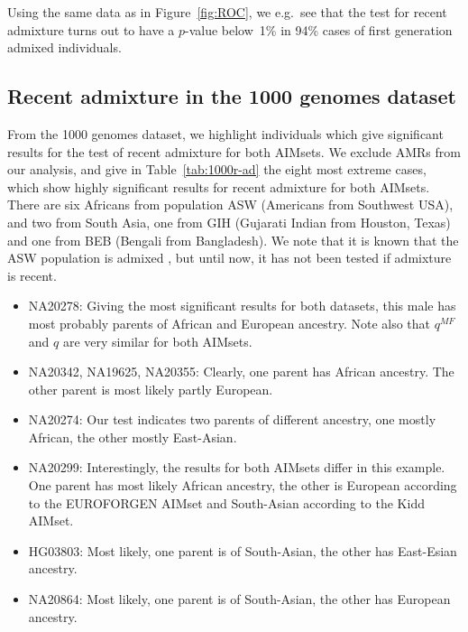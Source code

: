 \documentclass[12pt]{article}
\theoremstyle{definition}
\begin{document}
\begin{table}
  \centering
  
  \caption{Using the same data as in Figure~\ref{fig:ROC}, we e.g.\
    see that the test for recent admixture turns out to have a
    $p$-value below~1\% in 94\% cases of first generation admixed
    individuals.}
  \label{tab:power}
\end{table}

\subsection{Recent admixture in the 1000 genomes dataset}
From the 1000 genomes dataset, we highlight individuals which give
significant results for the test of recent admixture for both
AIMsets. We exclude AMRs from our analysis, and give in
Table~\ref{tab:1000r-ad} the eight most extreme cases, which show
highly significant results for recent admixture for both
AIMsets. There are six Africans from population ASW (Americans from
Southwest USA), and two from South Asia, one from GIH (Gujarati Indian
from Houston, Texas) and one from BEB (Bengali from Bangladesh). We
note that it is known that the ASW population is admixed
\cite{Eduardoff2016}, but until now, it has not been tested if
admixture is recent.

\begin{itemize}
\item NA20278: Giving the most significant results for both datasets,
  this male has most probably parents of African and European
  ancestry. Note also that $q^{MF}$ and $q$ are very similar for both
  AIMsets.
\item NA20342, NA19625, NA20355: Clearly, one parent has African
  ancestry. The other parent is most likely partly European.
\item NA20274: Our test indicates two parents of different ancestry,
  one mostly African, the other mostly East-Asian.
\item NA20299: Interestingly, the results for both AIMsets differ in
  this example. One parent has most likely African ancestry, the other
  is European according to the EUROFORGEN AIMset and South-Asian
  according to the Kidd AIMset.
\item HG03803: Most likely, one parent is of South-Asian, the other
  has East-Esian ancestry.
\item NA20864: Most likely, one parent is of South-Asian, the other
  has European ancestry.
\end{itemize}
\end{document}
